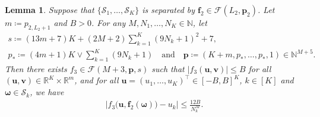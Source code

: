 \documentclass[12pt]{article}
\newtheorem{lemma}[thm]{Lemma}
\begin{document}
\begin{lemma} \label{lemma:use-embedding-to-extract-coordinates}
    Suppose that $\{\mathcal{S}_1,\ldots,\mathcal{S}_K\}$ is separated by $\bm f_2 \in \mathcal{F}(L_2,\bm p_2)$. Let $m \coloneqq p_{2,L_2+1}$ and $B > 0$. For any $M,N_1,\ldots,N_K \in \mathbb{N}$, let
    \begin{gather*}
        s \coloneqq (13m+7)K + (2M+2)\sum_{k=1}^K(9N_k+1)^2 + 7,\\
        p_* \coloneqq (4m+1)K \vee  \sum_{k=1}^K (9N_k+1) \quad \text{and} \quad \bm p \coloneqq (K+m, p_*, \ldots, p_*, 1) \in \mathbb{N}^{M+5}.
    \end{gather*}
    Then there exists $f_3\in\mathcal{F}(M+3, \bm p, s)$ such that $|f_3(\bm u, \bm v)| \leq B$ for all $(\bm u, \bm v) \in \mathbb{R}^K \times \mathbb{R}^m$, and for all $\bm u=(u_1,\ldots,u_K)^\top \in [-B,B]^K$, $k\in[K]$ and $\bm\omega \in \mathcal{S}_k$, we have
    \begin{align*}
        \bigl|f_3 \bigl(\bm u, \bm f_2(\bm\omega)\bigr) - u_k \bigr| \leq\frac{12B}{N_k^M}.
    \end{align*}
\end{lemma}
\end{document}
